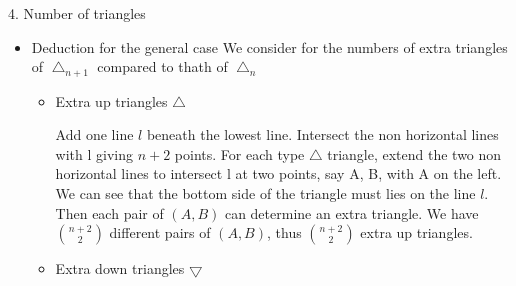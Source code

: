 \documentclass{beamer}
\begin{document}
\begin{frame}{4. Number of triangles}
\begin{itemize}
    \item Deduction for the general case
          We consider for the numbers of extra triangles of $\bigtriangleup_{n+1}$ compared to thath of
          $\bigtriangleup_{n}$
          \begin{itemize}
            \item Extra up triangles $\bigtriangleup$
                  \begin{minipage}{0.8\linewidth}
                    Add one line $l$ beneath the lowest line. Intersect the non horizontal
                    lines with l giving $n + 2$ points.
                    For each type $\bigtriangleup$ triangle, extend the two non horizontal
                    lines to intersect l at two points,
                    say A, B, with A on the left.
                    We can see that the bottom side of the triangle must lies on the line $l$. Then each pair of $(A,B)$
                    can determine an extra triangle. We have $\binom{n+2}{2}$ different pairs of $(A,B)$, thus
                    $\binom{n+2}{2}$
                    extra up triangles.
                  \end{minipage}%
                  \begin{minipage}{0.2\linewidth}
                \end{minipage}
             \framebreak
            \item Extra down triangles $\bigtriangledown$
                  \begin{minipage}{0.7\linewidth}
                    

\end{minipage}
\end{itemize}
\end{itemize}
\end{frame}
\end{document}
